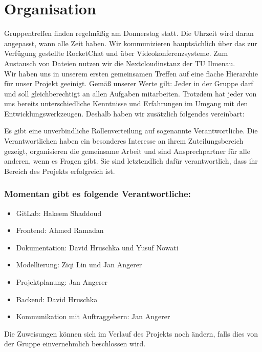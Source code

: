 \section{Organisation}
Gruppentreffen finden regelmäßig am Donnerstag statt. Die Uhrzeit wird daran angepasst, wann alle Zeit haben. Wir kommunizieren hauptsächlich über das zur Verfügung gestellte RocketChat und über Videokonferenzsysteme. Zum Austausch von Dateien nutzen wir die Nextcloudinstanz der TU Ilmenau. \\

\noindent Wir haben uns in unserem ersten gemeinsamen Treffen auf eine flache Hierarchie für unser Projekt geeinigt. Gemäß unserer Werte  gilt: Jeder in der Gruppe darf und soll gleichberechtigt an allen Aufgaben mitarbeiten. Trotzdem hat jeder von uns bereits unterschiedliche Kenntnisse und Erfahrungen im Umgang mit den Entwicklungswerkzeugen. Deshalb haben wir zusätzlich folgendes vereinbart:

\noindent Es gibt eine unverbindliche Rollenverteilung auf sogenannte Verantwortliche. Die Verantwortlichen haben ein besonderes Interesse an ihrem Zuteilungsbereich gezeigt, organisieren die gemeinsame Arbeit und sind Ansprechpartner für alle anderen, wenn es Fragen gibt. Sie sind letztendlich dafür verantwortlich, dass ihr Bereich des Projekts erfolgreich ist.\\

\subsubsection*{Momentan gibt es folgende Verantwortliche:}
\begin{itemize}
    \item GitLab: Hakeem Shaddoud
    \item Frontend: Ahmed Ramadan
    \item Dokumentation: David Hruschka und Yusuf Nowati
    \item Modellierung: Ziqi Lin und  Jan Angerer
    \item Projektplanung: Jan Angerer
    \item Backend: David Hruschka
    \item Kommunikation mit Auftraggebern: Jan Angerer
\end{itemize}{}
\vspace{0,5cm}
\noindent Die Zuweisungen können sich im Verlauf des Projekts noch ändern, falls dies von der Gruppe einvernehmlich beschlossen wird.